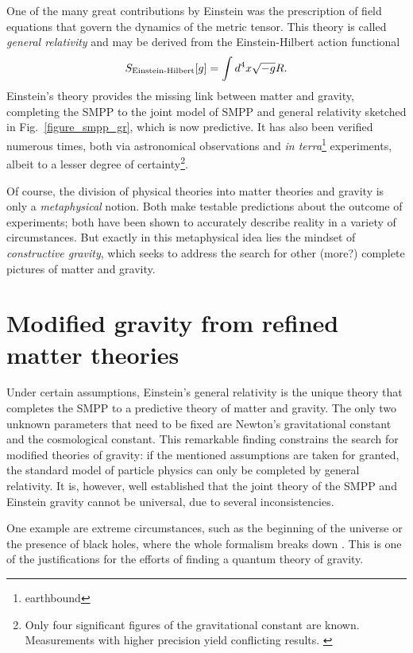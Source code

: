 One of the many great contributions by Einstein was the prescription of field equations that govern the dynamics of the metric tensor. \cite{Einstein_1916} This theory is called \emph{general relativity} and may be derived from the Einstein-Hilbert action functional
\begin{equation*}
  S_\text{Einstein-Hilbert}\lbrack g\rbrack = \int\mathrm \mathrm d^4x \sqrt{-g} R.
\end{equation*}
Einstein's theory provides the missing link between matter and gravity, completing the SMPP to the joint model of SMPP and general relativity sketched in Fig.~\ref{figure_smpp_gr}, which is now predictive. It has also been verified numerous times, both via astronomical observations and \emph{in terra}\footnote{earthbound} experiments, albeit to a lesser degree of certainty\footnote{Only four significant figures of the gravitational constant are known. \cite{Mohr_2016} Measurements with higher precision yield conflicting results. \cite{Mohr_2012}}.

Of course, the division of physical theories into matter theories and gravity is only a \emph{metaphysical} notion. Both make testable predictions about the outcome of experiments; both have been shown to accurately describe reality in a variety of circumstances. But exactly in this metaphysical idea lies the mindset of \emph{constructive gravity}, which seeks to address the search for other (more?) complete pictures of matter and gravity.

\section{Modified gravity from refined matter theories}
Under certain assumptions, Einstein's general relativity is the unique theory that completes the SMPP to a predictive theory of matter and gravity.\cite{Lovelock_1969,Hojman_1976,Deser_1970} The only two unknown parameters that need to be fixed are Newton's gravitational constant and the cosmological constant. This remarkable finding constrains the search for modified theories of gravity: if the mentioned assumptions are taken for granted, the standard model of particle physics can only be completed by general relativity. It is, however, well established that the joint theory of the SMPP and Einstein gravity cannot be universal, due to several inconsistencies.

One example are extreme circumstances, such as the beginning of the universe or the presence of black holes, where the whole formalism breaks down \cite{}. This is one of the justifications for the efforts of finding a quantum theory of gravity.

